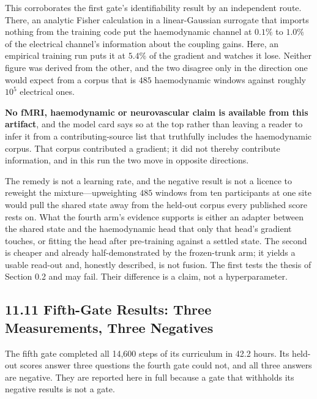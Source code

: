 This corroborates the first gate's identifiability result by an independent
route. There, an analytic Fisher calculation in a linear-Gaussian surrogate that
imports nothing from the training code put the haemodynamic channel at \(0.1\%\)
to \(1.0\%\) of the electrical channel's information about the coupling gains.
Here, an empirical training run puts it at \(5.4\%\) of the gradient and watches
it lose. Neither figure was derived from the other, and the two disagree only in the
direction one would expect from a corpus that is \(485\) haemodynamic windows
against roughly \(10^5\) electrical ones.

\textbf{No fMRI, haemodynamic or neurovascular claim is available from this
artifact}, and the model card says so at the top rather than leaving a reader to
infer it from a contributing-source list that truthfully includes the
haemodynamic corpus. That corpus contributed a gradient; it did not thereby
contribute information, and in this run the two move in opposite directions.

The remedy is not a learning rate, and the negative result is not a licence to
reweight the mixture---upweighting \(485\) windows from ten participants at one
site would pull the shared state away from the held-out corpus every published
score rests on. What the fourth arm's evidence supports is either an adapter
between the shared state and the haemodynamic head that only that head's gradient
touches, or fitting the head after pre-training against a settled state. The
second is cheaper and already half-demonstrated by the frozen-trunk arm; it
yields a usable read-out and, honestly described, is not fusion. The first tests
the thesis of Section 0.2 and may fail. Their difference is a claim, not a
hyperparameter.

\subsection{11.11 Fifth-Gate Results: Three Measurements, Three Negatives}

The fifth gate completed all 14{,}600 steps of its curriculum in 42.2 hours. Its
held-out scores answer three questions the fourth gate could not, and all three
answers are negative. They are reported here in full because a gate that
withholds its negative results is not a gate.

